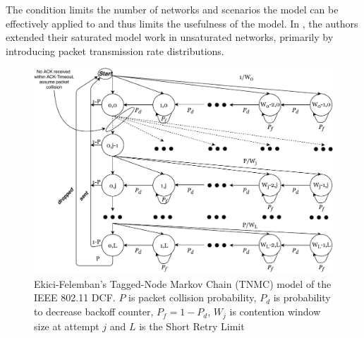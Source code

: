 The condition limits the number of networks and scenarios the model can be
effectively applied to and thus limits the usefulness of the model. In
\cite{felemban}, the authors extended their saturated model work in
unsaturated networks, primarily by introducing packet transmission rate
distributions.

\begin{figure}
\center
\includegraphics[width=1\textwidth]{images/tnmc-dcf.pdf}
\caption{Ekici-Felemban's Tagged-Node Markov Chain (TNMC) model of the IEEE 802.11 DCF. $P$ is packet collision probability, $P_d$ is probability to decrease backoff counter, $P_f = 1 - P_d$, $W_j$ is contention window size at attempt $j$ and $L$ is the Short Retry Limit}
\label{fig:tnmc}
\end{figure}
